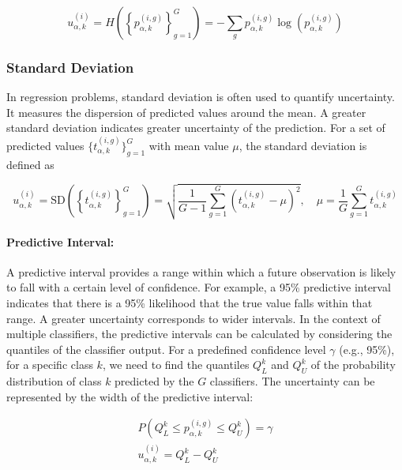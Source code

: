 \begin{equation}
u_{\alpha,k}^{(i)}=H\left(\left\{p_{\alpha,k}^{(i,g)}\right\}_{g=1}^{G}\right)=-\sum_{g}{p_{\alpha,k}^{(i,g)} \log\left(p_{\alpha,k}^{(i,g)}\right)}
\label{crowd.Eq.5.uncertainty}
\end{equation}


\subsubsection{Standard Deviation}
In regression problems, standard deviation is often used to quantify uncertainty. It measures the dispersion of predicted values around the mean. A greater standard deviation indicates greater uncertainty of the prediction. For a set of predicted values $ \{t_{\alpha,k}^{(i,g)} \}_{g=1}^G $ with mean value $\mu $, the standard deviation is defined as

\begin{equation}
    u_{\alpha,k}^{(i)}=\text{SD}\left(\left\{t_{\alpha,k}^{(i,g)}\right\}_{g=1}^G\right)=\sqrt {\frac{1}{G-1 }\sum_{g=1}^G\left(t_{\alpha,k}^{(i,g)}-\mu\right)^{2}},\quad\mu=\frac{1}{G}\sum_{g=1}^{G}{t_{\alpha,k}^{(i,g)}}
    \label{crowd.Eq.6.uncertainty.sd}
\end{equation}

\paragraph{Predictive Interval:}
A predictive interval provides a range within which a future observation is likely to fall with a certain level of confidence. For example, a 95\% predictive interval indicates that there is a 95\% likelihood that the true value falls within that range. A greater uncertainty corresponds to wider intervals. In the context of multiple classifiers, the predictive intervals can be calculated by considering the quantiles  of the classifier output. For a predefined confidence level $\gamma $ (e.g., 95\%), for a specific class $k $, we need to find the quantiles $Q_{L}^{k} $ and $Q_{U}^{k} $ of the probability distribution of class $k $ predicted by the $G $ classifiers. The uncertainty can be represented by the width of the predictive interval:

\begin{equation}
    \begin{aligned}
        P\left(Q_L^{k} \leq p_{\alpha,k}^{(i,g)} \leq Q_U^{k}\right) = \gamma
        \\
        u_{\alpha,k}^{(i)} = Q_L^{k} - Q_U^{k}
    \end{aligned}
    \label{crowd.Eq.uncertainty}
\end{equation}

